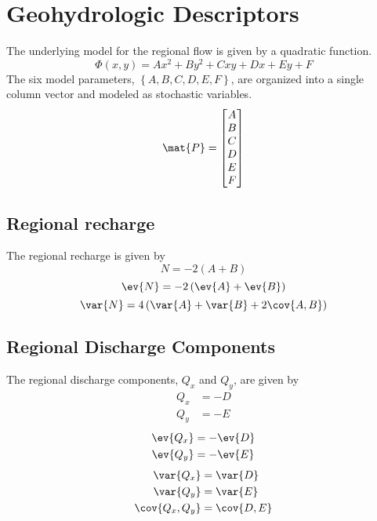 \section{Geohydrologic Descriptors}
The underlying model for the regional flow is given by a quadratic function.
%
\begin{equation}\label{2.1}
    \Phi(x,y) = A x^2 + B y^2 + C xy + Dx + Ey + F
\end{equation}
%
The six model parameters, $\left\{ A, B, C, D, E, F \right\}$, are organized into a single column vector and modeled as stochastic variables.
%
\begin{equation}\label{2.2}
    \mat{P} = \begin{bmatrix} A \\ B \\ C \\ D \\ E \\ F \end{bmatrix}
\end{equation}
%

\newpage
\subsection{Regional recharge}
The regional recharge is given by
%
\begin{equation}\label{2.3}
    N = -2 \left( A + B \right)
\end{equation}
%
\begin{equation}\label{2.4}
    \ev{N} = -2 \left( \ev{A} + \ev{B} \right)
\end{equation}
%
\begin{equation}\label{2.5}
    \var{N} = 4 \left( \var{A} + \var{B} + 2\cov{A,B} \right)
\end{equation}


\subsection{Regional Discharge Components}
The regional discharge components, $Q_x$ and $Q_y$, are given by
%
\begin{align}
    Q_x &= -D    \label{2.6}\\
    Q_y &= -E    \label{2.7}
\end{align}
%
\begin{align}
    \ev{Q_x} &= -\ev{D} \label{2.8}\\
    \ev{Q_y} &= -\ev{E} \label{2.9}
\end{align}
%
\begin{align}
    \var{Q_x} &= \var{D} \label{2.10}\\
    \var{Q_y} &= \var{E} \label{2.11}\\
    \cov{Q_x,Q_y} &= \cov{D,E} \label{2.12}
\end{align}

